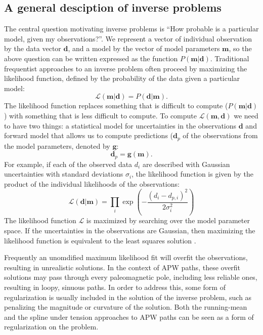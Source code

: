 \documentclass[preprint,12pt,authoryear]{elsarticle}
\begin{document}
\subsection{A general desciption of inverse problems}
\label{sec:intro_inverse_problems}
The central question motivating inverse problems is ``How probable is a particular model, given my observations?''.
We represent a vector of individual observation by the data vector $\mathbf{d}$, and a model
by the vector of model parameters $\mathbf{m}$, so the above question can be written expressed as the function $P(\mathbf{m} \vert \mathbf{d})$.
Traditional frequentist approaches to an inverse problem often proceed by maximizing the likelihood function,
defined by the probability of the data given a particular model:
\begin{equation}
\mathcal{L} ( \mathbf{m} \vert \mathbf{d} ) = P( \mathbf{d} \vert \mathbf{m} ).
\label{eq:likelihood}
\end{equation}
The likelihood function replaces something that is difficult to compute ($P(\mathbf{m} \vert \mathbf{d})$)
with something that is less difficult to compute. 
To compute $\mathcal{L}(\mathbf{m}, \mathbf{d})$ we need to have two things: a statistical model for 
uncertainties in the observations $\mathbf{d}$ and forward model that allows us to compute
predictions ($\mathbf{d}_p$ of the observations from the model parameters, denoted by $\mathbf{g}$:
\begin{equation}
\mathbf{d}_p = \mathbf{g}(\mathbf{m}).
\label{eq:forward}
\end{equation}
For example, if each of the observed data $d_i$ are described with Gaussian uncertainties
with standard deviations $\sigma_i$, the likelihood function is given by the product
of the individual likelihoods of the observations:
\begin{equation}
\mathcal{L}(\mathbf{d} | \mathbf{m} ) = \displaystyle\prod_i \exp\left({-\frac{(d_i - d_{p,i})^2}{2 \sigma_i^2}}\right)
\label{eq:example_likelihood}
\end{equation}
The likelihood function $\mathcal{L}$ is maximized by searching over the model parameter space.
If the uncertainties in the observations are Gaussian, then maximizing the likelihood function is
equivalent to the least squares solution \citep{aster2005parameter}.

Frequently an unomdified maximum likelihood fit will overfit the observations, resulting
in unrealistic solutions. In the context of APW paths, these overfit solutions may
pass through every paleomagnetic pole, including less reliable ones, resulting in
loopy, sinuous paths. In order to address this, some form of regularization is usually
included in the solution of the inverse problem, such as penalizing the magnitude or
curvature of the solution. Both the running-mean and the spline under tension approaches
to APW paths can be seen as a form of regularization on the problem.
\end{document}
